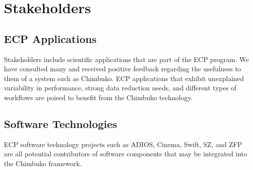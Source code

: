 \section{Stakeholders}

\subsection{ECP Applications}
Stakeholders include scientific applications that are part of the ECP program. We have consulted many and received positive feedback regarding the usefulness to them of a system such as Chimbuko. ECP applications that exhibit unexplained variability in performance, strong data reduction needs, and different types of workflows are poised to benefit from the Chimbuko technology.

\subsection{Software Technologies}					
ECP software technology  projects such as ADIOS, Cinema, Swift, SZ, and ZFP are all potential contributors of software components that may be integrated into the Chimbuko framework.


